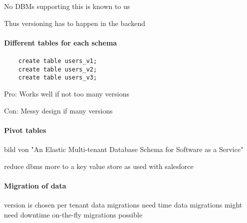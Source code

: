   No DBMs supporting this is known to us

  Thus versioning has to happen in the backend

  \paragraph{Different tables for each schema}
  \lstset{language=SQL, caption=sql, label=sql}
  \begin{lstlisting}
    create table users_v1;
    create table users_v2;
    create table users_v3;
  \end{lstlisting}

  Pro:
  Works well if not too many versions

  Con:
  Messy design if many versions


  \paragraph{Pivot tables}

  bild von "An Elastic Multi-tenant Database Schema for Software as a Service"

  reduce dbms more to a key value store
  as used with salesforce

\paragraph{Migration of data}
  version is chosen per tenant
  data migrations need time
  data migrations might need downtime
  on-the-fly migrations possible

